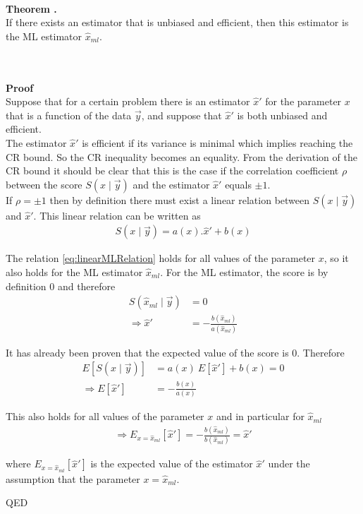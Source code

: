 \documentclass[report,12pt]{report}
\newcounter{theorem}
\newcounter{chpt}
\newcommand{\theorem}[2]
	{
		\hfill\\
		\textbf{Theorem \arabic{chpt}.\arabic{theorem}}\\
		#1
		\hfill\\
		\hfill\\
		\textbf{Proof}\\
		#2
		\begin{flushright}QED\end{flushright}
		\stepcounter{theorem}
}
\begin{document}
\theorem
{
If there exists an estimator that is unbiased and efficient, then this estimator is the ML estimator $\hat x_{ml}$. 
}
{
Suppose that for a certain problem there is an estimator $\hat x'$ for the parameter $x$ that is a function of the data $\vec y$, and suppose that $\hat x'$ is both unbiased and efficient.\\

The estimator $\hat x'$ is efficient if its variance is minimal which implies reaching the CR bound. So the CR inequality becomes an equality. From the derivation of the CR bound it should be clear that this is the case if the correlation coefficient $\rho$ between the score $S(x \mid \vec y)$ and the estimator $\hat x'$ equals $\pm 1$.\\

If $\rho = \pm 1$ then by definition there must exist a linear relation between $S(x \mid \vec y)$ and $\hat x'$. This linear relation can be written as
\begin{align}
	S(x \mid \vec y) = a(x).\hat x' + b(x)
	\label{eq:linearMLRelation}
\end{align}

The relation \ref{eq:linearMLRelation} holds for all values of the parameter $x$, so it also holds for the ML estimator $\hat x_{ml}$. For the ML estimator, the score is by definition $0$ and therefore 
\begin{align}
	S(\hat x_{ml} \mid \vec y) &= 0
	\nonumber\\
	\Rightarrow \hat x' &= -\frac{b(\hat x_{ml})}{a(\hat x_{ml})}
\end{align}

It has already been proven that the expected value of the score is $0$. Therefore
\begin{align}
	E\left[ S(x \mid \vec y) \right] &= 
	a(x)\ E\left[ \hat x' \right] + b(x) = 0
	\nonumber\\
	\Rightarrow E\left[ \hat x' \right] &= -\frac{b(x)}{a(x)}
	\label{eq:a}
\end{align}


This also holds for all values of the parameter $x$ and in particular for $\hat x_{ml}$
\begin{align}
	\Rightarrow E_{x=\hat x_{ml}}\left[\hat x' \right]
	= -\frac{b(\hat x_{ml})}{b(\hat x_{ml})} = \hat x'
	\label{eq:i}
\end{align}

where $E_{x=\hat x_{ml}}\left[\hat x' \right]$ is the expected value of the estimator $\hat x'$ under the assumption that the parameter $x = \hat x_{ml}$.

}
\end{document}
